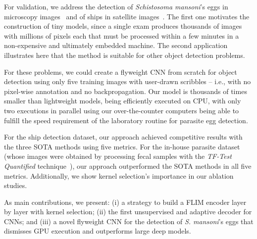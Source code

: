 \documentclass[10pt,twocolumn,twoside]{IEEEtran}
\begin{document}
For validation, we address the detection of \textit{Schistosoma mansoni}'s eggs in microscopy images~\cite{santos2019tf} and of ships in satellite images~\cite{ships2018}. The first one motivates the construction of tiny models, since a single exam produces thousands of images with millions of pixels each that must be processed within a few minutes in a non-expensive and ultimately embedded machine. The second application illustrates here that the method is suitable for other object detection problems.

For these problems, we could create a flyweight CNN from scratch for object detection using only five training images with user-drawn scribbles -- i.e., with no pixel-wise annotation and no backpropagation. Our model is thousands of times smaller than lightweight models, being efficiently executed on CPU, with only two executions in parallel using our over-the-counter computers being able to fulfill the speed requirement of the laboratory routine for parasite egg detection. 

For the ship detection dataset, our approach achieved competitive results with the three SOTA methods using five metrics. For the in-house parasite dataset (whose images were obtained by processing fecal samples with the \textit{TF-Test Quantified} technique~\cite{santos2019tf}), our approach outperformed the SOTA methods in all five metrics. Additionally, we show kernel selection's importance %
in our ablation studies.

As main contributions, we present: (i) a strategy to build a FLIM encoder layer by layer with kernel selection; (ii) the first unsupervised and adaptive decoder for CNNs; and (iii) a novel flyweight CNN for the detection of \textit{S. mansoni}'s eggs that dismisses GPU execution and outperforms large deep models. 
\end{document}
